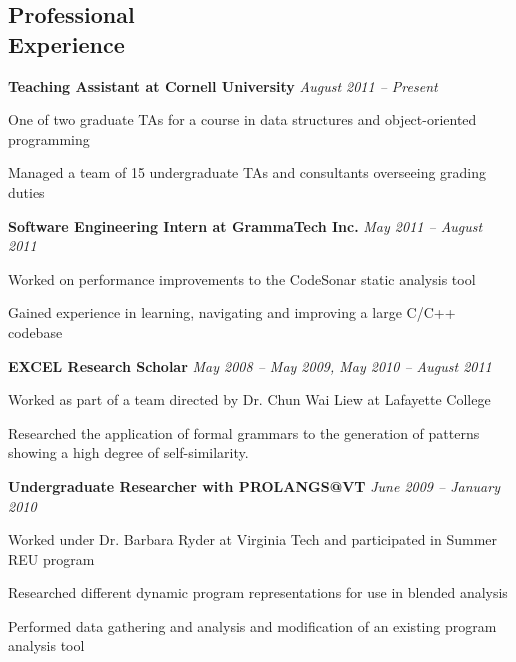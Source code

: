 \documentclass[margin,line]{resume}
\begin{document}
\begin{resume}
    \section{\mysidestyle Professional\\Experience} 

    {\bf Teaching Assistant at Cornell University} \hfill {\sl August 2011 --
      Present} \\
    
    \begin{list2}
      \item One of two graduate TAs for a course in data structures and
        object-oriented programming
      \item Managed a team of 15 undergraduate TAs and consultants overseeing
        grading duties
    \end{list2}


    {\bf Software Engineering Intern at GrammaTech Inc.} \hfill {\sl May 2011 -- August 2011} \\
    \begin{list2}
        \item Worked on performance improvements to the CodeSonar static analysis tool
        \item Gained experience in learning, navigating and improving a large
          C/C++ codebase
    \end{list2}

    {\bf EXCEL Research Scholar} \hfill   {\sl May 2008 -- May 2009, May 2010 --
      August 2011} \\
    \begin{list2}
    	\item Worked as part of a team directed by Dr. Chun Wai Liew at Lafayette College
    	\item Researched the application of formal grammars to the generation of patterns showing a high degree of self-similarity.
    \end{list2}

    {\bf Undergraduate Researcher with PROLANGS@VT } \hfill   {\sl June 2009 -- January 2010} \\
    \begin{list2}
    	\item Worked under Dr. Barbara Ryder at Virginia Tech and participated in Summer REU program
	\item Researched different dynamic program representations for use in blended analysis
	\item Performed data gathering and analysis and modification of an existing program analysis tool
    \end{list2}
    


\end{resume}
\end{document}
